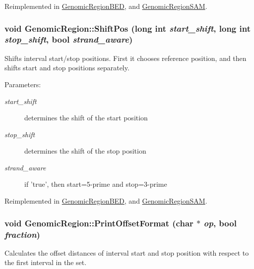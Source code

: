Reimplemented in \hyperlink{classGenomicRegionBED_c515c70f443db400f911452ed359433b}{GenomicRegionBED}, and \hyperlink{classGenomicRegionSAM_353207352073db00dee0a9b620dca197}{GenomicRegionSAM}.\hypertarget{classGenomicRegion_0ee8c165839c79afdc586f8b5e07788e}{
\subsubsection[ShiftPos]{\setlength{\rightskip}{0pt plus 5cm}void GenomicRegion::ShiftPos (long int {\em start\_\-shift}, \/  long int {\em stop\_\-shift}, \/  bool {\em strand\_\-aware})}}
\label{classGenomicRegion_0ee8c165839c79afdc586f8b5e07788e}


Shifts interval start/stop positions. First it chooses reference position, and then shifts start and stop positions separately. 

\begin{Desc}
\item[Parameters:]
\begin{description}
\item[{\em start\_\-shift}]determines the shift of the start position \item[{\em stop\_\-shift}]determines the shift of the stop position \item[{\em strand\_\-aware}]if 'true', then start=5-prime and stop=3-prime \end{description}
\end{Desc}


Reimplemented in \hyperlink{classGenomicRegionBED_fd2f05cec2af5186794f40f221e040b1}{GenomicRegionBED}, and \hyperlink{classGenomicRegionSAM_fb2701ba1a521ae2c07ea0ace2f9ee77}{GenomicRegionSAM}.\hypertarget{classGenomicRegion_33d1e5544b3fb81e8c19468b91920b1d}{
\subsubsection[PrintOffsetFormat]{\setlength{\rightskip}{0pt plus 5cm}void GenomicRegion::PrintOffsetFormat (char $\ast$ {\em op}, \/  bool {\em fraction})}}
\label{classGenomicRegion_33d1e5544b3fb81e8c19468b91920b1d}


Calculates the offset distances of interval start and stop position with respect to the first interval in the set. 

